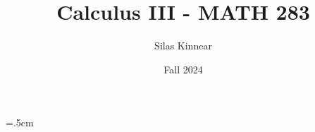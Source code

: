 \documentclass[a4paper,12pt,openany]{book}
\begin{document}
\title{Calculus III - MATH 283}
\author{Silas Kinnear}
\date{Fall 2024}
\maketitle

\tableofcontents
{}
\parskip=.5cm
\parindent=0cm















\end{document}
